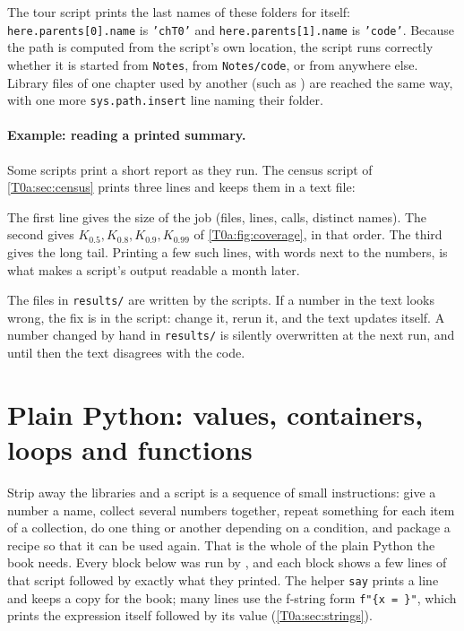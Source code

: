 The tour script  prints the last names of these folders for itself: \texttt{here.parents[0].name} is \texttt{'chT0'} and \texttt{here.parents[1].name} is \texttt{'code'}. Because the path is computed from the script's own location, the script runs correctly whether it is started from \texttt{Notes}, from \texttt{Notes/code}, or from anywhere else. Library files of one chapter used by another (such as ) are reached the same way, with one more \texttt{sys.path.insert} line naming their folder.

\paragraph{Example: reading a printed summary.} Some scripts print a short report as they run. The census script of \cref{T0a:sec:census} prints three lines and keeps them in a text file:


The first line gives the size of the job (files, lines, calls, distinct names). The second gives $K_{0.5},K_{0.8},K_{0.9},K_{0.99}$ of \cref{T0a:fig:coverage}, in that order. The third gives the long tail. Printing a few such lines, with words next to the numbers, is what makes a script's output readable a month later.

\begin{pitfall}
The files in \texttt{results/} are written by the scripts. If a number in the text looks wrong, the fix is in the script: change it, rerun it, and the text updates itself. A number changed by hand in \texttt{results/} is silently overwritten at the next run, and until then the text disagrees with the code.
\end{pitfall}
\section{Plain Python: values, containers, loops and functions}
\label{T0a:sec:python}

Strip away the libraries and a script is a sequence of small instructions: give a number a name, collect several numbers together, repeat something for each item of a collection, do one thing or another depending on a condition, and package a recipe so that it can be used again. That is the whole of the plain Python the book needs. Every block below was run by , and each block shows a few lines of that script followed by exactly what they printed. The helper \texttt{say} prints a line and keeps a copy for the book; many lines use the f-string form \texttt{f"\{x = \}"}, which prints the expression itself followed by its value (\cref{T0a:sec:strings}).

